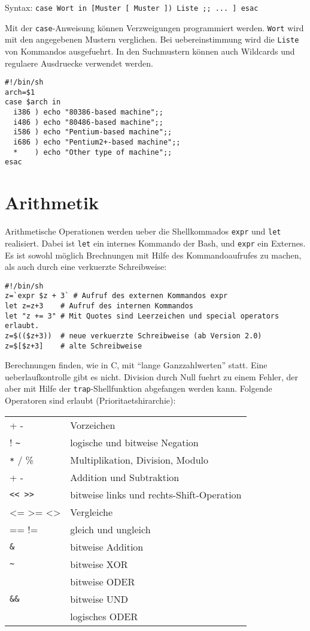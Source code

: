 \documentclass[12pt,]{article}
\begin{document}
Syntax:
\texttt{case\ Wort\ in\ {[}Muster\ {[}\textbar{}\ Muster\ {]})\ Liste\ ;;\ ...~{]}\ esac}

Mit der \texttt{case}-Anweisung können Verzweigungen programmiert
werden. \texttt{Wort} wird mit den angegebenen Mustern verglichen. Bei
uebereinstimmung wird die \texttt{Liste} von Kommandos ausgefuehrt. In
den Suchmustern können auch Wildcards und regulaere Ausdruecke verwendet
werden.

\begin{verbatim}
#!/bin/sh
arch=$1
case $arch in
  i386 ) echo "80386-based machine";;
  i486 ) echo "80486-based machine";;
  i586 ) echo "Pentium-based machine";;
  i686 ) echo "Pentium2+-based machine";;
  *    ) echo "Other type of machine";;
esac
\end{verbatim}

\section{Arithmetik}\label{arithmetik}

Arithmetische Operationen werden ueber die Shellkommados \texttt{expr}
und \texttt{let} realisiert. Dabei ist \texttt{let} ein internes
Kommando der Bash, und \texttt{expr} ein Externes. Es ist sowohl möglich
Brechnungen mit Hilfe des Kommandoaufrufes zu machen, als auch durch
eine verkuerzte Schreibweise:

\begin{verbatim}
#!/bin/sh
z=`expr $z + 3` # Aufruf des externen Kommandos expr
let z=z+3    # Aufruf des internen Kommandos
let "z += 3" # Mit Quotes sind Leerzeichen und special operators erlaubt.
z=$(($z+3))  # neue verkuerzte Schreibweise (ab Version 2.0)
z=$[$z+3]    # alte Schreibweise
\end{verbatim}

Berechnungen finden, wie in C, mit ``lange Ganzzahlwerten'' statt. Eine
ueberlaufkontrolle gibt es nicht. Division durch Null fuehrt zu einem
Fehler, der aber mit Hilfe der \texttt{trap}-Shellfunktion abgefangen
werden kann. Folgende Operatoren sind erlaubt (Prioritaetshirarchie):

\begin{longtable}[c]{@{}ll@{}}
\toprule
+ - & Vorzeichen\tabularnewline
! \texttt{\textasciitilde{}} & logische und bitweise
Negation\tabularnewline
\texttt{*} / \% & Multiplikation, Division, Modulo\tabularnewline
+ - & Addition und Subtraktion\tabularnewline
\texttt{\textless{}\textless{}\ \textgreater{}\textgreater{}} & bitweise
links und rechts-Shift-Operation\tabularnewline
\textless{}= \textgreater{}= \textless{}\textgreater{} &
Vergleiche\tabularnewline
== != & gleich und ungleich\tabularnewline
\texttt{\&} & bitweise Addition\tabularnewline
\texttt{\textasciitilde{}} & bitweise XOR\tabularnewline
\textbar{} & bitweise ODER\tabularnewline
\texttt{\&\&} & bitweise UND\tabularnewline
\textbar{}\textbar{} & logisches ODER\tabularnewline
\bottomrule
\end{longtable}
\end{document}

